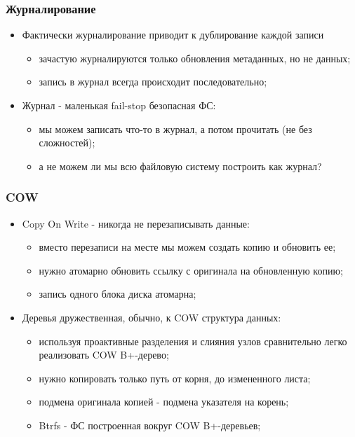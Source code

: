 \begin{frame}
\frametitle{Журналирование}
\begin{itemize}
  \item<1-> Фактически журналирование приводит к дублирование каждой записи
    \begin{itemize}
      \item зачастую журналируются только обновления метаданных, но не данных;
      \item запись в журнал всегда происходит последовательно;
    \end{itemize}
  \item<2-> Журнал - маленькая fail-stop безопасная ФС:
    \begin{itemize}
      \item мы можем записать что-то в журнал, а потом прочитать (не без сложностей);
      \item а не можем ли мы всю файловую систему построить как журнал?
    \end{itemize}
\end{itemize}
\end{frame}

\begin{frame}
\frametitle{COW}
\begin{itemize}
  \item<1-> Copy On Write - никогда не перезаписывать данные:
    \begin{itemize}
      \item вместо перезаписи на месте мы можем создать копию и обновить ее;
      \item нужно атомарно обновить ссылку с оригинала на обновленную копию;
      \item запись одного блока диска атомарна;
    \end{itemize}
  \item<2-> Деревья дружественная, обычно, к COW структура данных:
    \begin{itemize}
      \item используя проактивные разделения и слияния узлов сравнительно легко реализовать COW B+-дерево;
      \item нужно копировать только путь от корня, до измененного листа;
      \item подмена оригинала копией - подмена указателя на корень;
      \item Btrfs - ФС построенная вокруг COW B+-деревьев;
    \end{itemize}
\end{itemize}
\end{frame}
